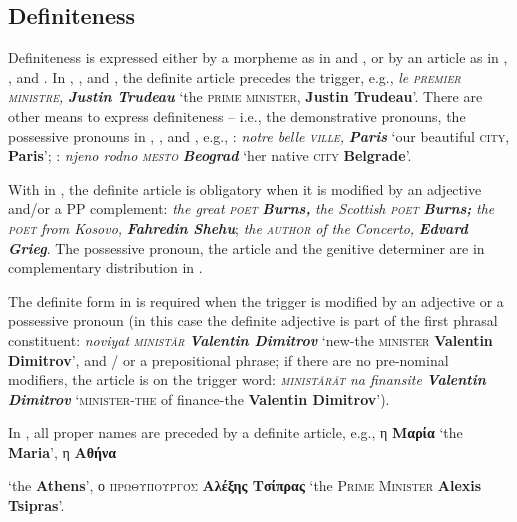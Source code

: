 \documentclass[output=paper]{langsci/langscibook}
\newcommand{\trigger}[1]{\textsc{#1}}
\begin{document}
{{\subsection{Definiteness} %

Definiteness is expressed either by a morpheme as in  and
, or by an article as in , , and . In ,
, and , the definite article precedes the trigger, e.g.,
\textit{le }\textit{\trigger{premier ministre}}\textit{,
}\textbf{\textit{Justin Trudeau}} ‘the \trigger{prime minister},
\textbf{Justin Trudeau}’. There are other means to express definiteness
– i.e., the demonstrative pronouns, the possessive pronouns in ,
, and , e.g., : \textit{notre belle
}\textit{\trigger{ville}}\textit{, }\textbf{\textit{Paris}} ‘our
beautiful \trigger{city}, \textbf{Paris}’; : \textit{njeno rodno
}\textit{\trigger{mesto}} \textbf{\textit{Beograd}} ‘her native
\trigger{city} \textbf{Belgrade}’.



With  in , the definite article is obligatory when
it is modified by an adjective and/or a PP complement: \textit{the
great }\textit{\trigger{poet}} \textbf{\textit{Burns, }}\textit{the
Scottish }\textit{\trigger{poet}}\textit{ }\textbf{\textit{Burns;}}
\textit{the }\textit{\trigger{poet}}\textit{ from Kosovo,
}\textbf{\textit{Fahredin Shehu}}; \textit{the }\textit{\trigger{author}}
\textit{of the Concerto, }\textbf{\textit{Edvard Grieg}}. The
possessive pronoun, the article and the genitive determiner are in
complementary distribution in .



The definite form in  is required when the trigger is modified
by an adjective or a possessive pronoun (in this case the definite
adjective is part of the first phrasal constituent: \textit{noviyat
}\textit{\trigger{ministăr}} \textbf{\textit{Valentin Dimitrov}} ‘new-the
\trigger{minister} \textbf{Valentin Dimitrov}’, and / or a prepositional
phrase; if there are no pre-nominal modifiers, the article is on the
trigger word: \textit{\trigger{ministărăt}} \textit{na finansite
}\textbf{\textit{Valentin Dimitrov}} ‘\trigger{minister-the} of
finance-the \textbf{Valentin Dimitrov}’).



In , all proper names are preceded by a definite article, e.g.,
η \textbf{Μαρία} ‘the \textbf{Maria}’, η
\textbf{Αθήνα}} ‘the \textbf{Athens}’, ο
\trigger{πρωθυπουργός} \textbf{Αλέξης Τσίπρας} ‘the
\trigger{Prime} \trigger{Minister} \textbf{Alexis Tsipras}’.



}
\end{document}
